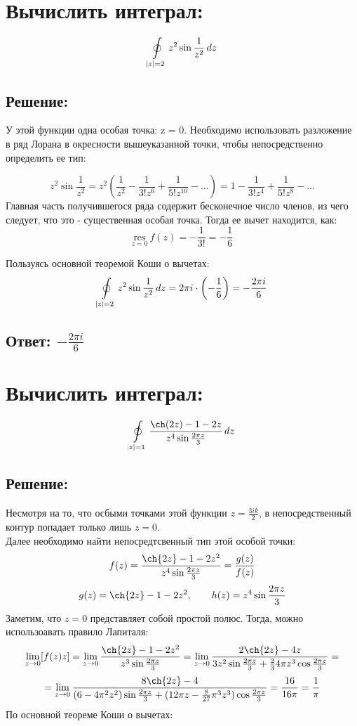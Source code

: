 \documentclass{article}
\begin{document}
    
        \section{Вычислить интеграл:} \[
        \ointop_{|z| = 2} z^2 \sin{\frac{1}{z^2}}\, dz
        \]
	\subsection{Решение:}
        У этой функции одна особая точка: z = 0. Необходимо использовать разложение в ряд Лорана в окресности вышеуказанной точки, чтобы непосредственно определить ее тип:
        
        \[
         z^2 \sin{\frac{1}{z^2}} = z^2 \left(\frac{1}{z^2} - \frac{1}{3!z^6} + \frac{1}{5!z^{10}} - \ldots\right) = 1 - \frac{1}{3!z^4} + \frac{1}{5!z^8} - \ldots
        \]
        Главная часть получившегося ряда содержит бесконечное число членов, из чего следует, что это - существенная особая точка. Тогда ее вычет находится, как:
        \[
        \underset{z = 0}{\text{res}}\ f(z) = -\frac{1}{3!} = -\frac{1}{6} 
        \]

        Пользуясь основной теоремой Коши о вычетах:
        \[
        \ointop_{|z| = 2} z^2 \sin{\frac{1}{z^2}}\, dz = 2\pi i \cdot \left( -\frac{1}{6} \right) = -\frac{2\pi i }{6}
        \]
        
                        
	\subsection{Ответ: $-\frac{2\pi i }{6}$}


        \section{Вычислить интеграл: 
         }
         \[
        \ointop_{|z| = 1} \frac{\ch(2z) - 1 - 2z}{z^4 \sin{\frac{2\pi z}{3}}} \, dz
        \]

	\subsection{Решение:}
        Несмотря на то, что осбыми точками этой функции $z = \frac{3ik}{2}$, в непосредственный контур попадает только лишь $z = 0$. \\
        Далее необходимо найти непосредтсвенный тип этой особой точки: 
        $$f(z) = \frac{\ch{2z} - 1 - 2z^2}{z^4 \sin{\frac{2\pi z}{3}}} = \frac{g(z)}{f(z)}$$
        $$g(z) = \ch{2z} - 1 - 2z^2, \quad \quad h(z) = z^4 \sin{\frac{2\pi z}{3}}$$
        Заметим, что $z = 0$ представляет собой простой полюс. Тогда, можно использоавать правило Лапиталя:
        $$\lim\limits_{z\rightarrow 0} [f(z)z] = \lim\limits_{z\rightarrow 0} \frac{\ch{2z} - 1 - 2z^2}{z^3 \sin{\frac{2\pi z}{3}}} = \lim\limits_{z\rightarrow 0}  \frac{2\ch{2z} - 4z}{3z^2 \sin{\frac{2\pi z}{3}} + \frac{2}{3} 4\pi z^3 \cos{\frac{2\pi z }{3}}} = $$
        $$ = \lim\limits_{z\rightarrow 0} \frac{8\ch{2z} - 4}{(6 - 4\pi^2 z^2)\sin{\frac{2\pi z}{3}} + (12\pi z - \frac{8}{27} \pi^3 z^3) \cos{\frac{2\pi z}{3}}} = \frac{16}{16\pi} = \frac{1}{\pi}$$
        По основной теореме Коши о вычетах:
         
\end{document}
